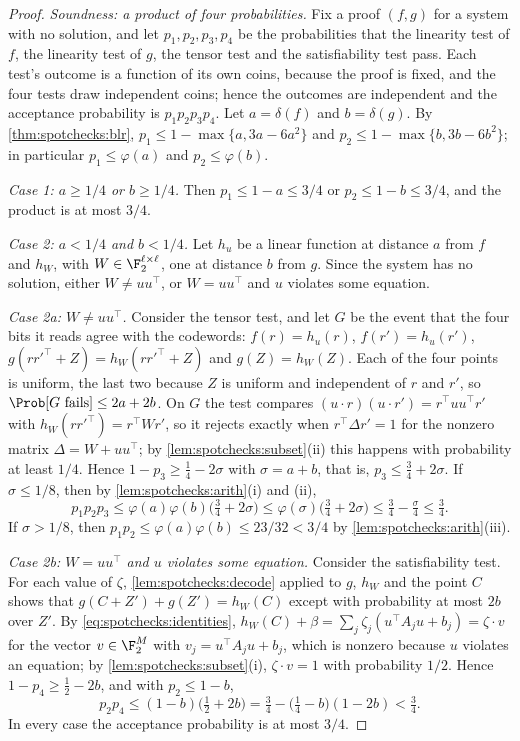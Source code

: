 \begin{refsection}
\begin{proof}
\emph{Soundness: a product of four probabilities.} Fix a proof $(f,g)$ for a system with no solution, and let $p_1,p_2,p_3,p_4$ be the probabilities that the linearity test of $f$, the linearity test of $g$, the tensor test and the satisfiability test pass. Each test's outcome is a function of its own coins, because the proof is fixed, and the four tests draw independent coins; hence the outcomes are independent and the acceptance probability is $p_1p_2p_3p_4$. Let $a=\delta(f)$ and $b=\delta(g)$. By \cref{thm:spotchecks:blr}, $p_1\le1-\max\{a,3a-6a^2\}$ and $p_2\le1-\max\{b,3b-6b^2\}$; in particular $p_1\le\varphi(a)$ and $p_2\le\varphi(b)$.

\emph{Case 1: $a\ge1/4$ or $b\ge1/4$.} Then $p_1\le1-a\le3/4$ or $p_2\le1-b\le3/4$, and the product is at most $3/4$.

\emph{Case 2: $a<1/4$ and $b<1/4$.} Let $h_u$ be a linear function at distance $a$ from $f$ and $h_W$, with $W\in\F_2^{\ell\times\ell}$, one at distance $b$ from $g$. Since the system has no solution, either $W\ne uu^\top$, or $W=uu^\top$ and $u$ violates some equation.

\emph{Case 2a: $W\ne uu^\top$.} Consider the tensor test, and let $G$ be the event that the four bits it reads agree with the codewords: $f(r)=h_u(r)$, $f(r')=h_u(r')$, $g(rr'^\top+Z)=h_W(rr'^\top+Z)$ and $g(Z)=h_W(Z)$. Each of the four points is uniform, the last two because $Z$ is uniform and independent of $r$ and $r'$, so $\Prob[G\text{ fails}]\le2a+2b$. On $G$ the test compares $(u\cdot r)(u\cdot r')=r^\top uu^\top r'$ with $h_W(rr'^\top)=r^\top Wr'$, so it rejects exactly when $r^\top\Delta r'=1$ for the nonzero matrix $\Delta=W+uu^\top$; by \cref{lem:spotchecks:subset}(ii) this happens with probability at least $1/4$. Hence $1-p_3\ge\frac14-2\sigma$ with $\sigma=a+b$, that is, $p_3\le\frac34+2\sigma$. If $\sigma\le1/8$, then by \cref{lem:spotchecks:arith}(i) and (ii),
\[
  p_1p_2p_3\le\varphi(a)\varphi(b)\bigl(\tfrac34+2\sigma\bigr)\le\varphi(\sigma)\bigl(\tfrac34+2\sigma\bigr)\le\tfrac34-\tfrac\sigma4\le\tfrac34.
\]
If $\sigma>1/8$, then $p_1p_2\le\varphi(a)\varphi(b)\le23/32<3/4$ by \cref{lem:spotchecks:arith}(iii).

\emph{Case 2b: $W=uu^\top$ and $u$ violates some equation.} Consider the satisfiability test. For each value of $\zeta$, \cref{lem:spotchecks:decode} applied to $g$, $h_W$ and the point $C$ shows that $g(C+Z')+g(Z')=h_W(C)$ except with probability at most $2b$ over $Z'$. By \eqref{eq:spotchecks:identities}, $h_W(C)+\beta=\sum_j\zeta_j(u^\top A_ju+b_j)=\zeta\cdot v$ for the vector $v\in\F_2^M$ with $v_j=u^\top A_ju+b_j$, which is nonzero because $u$ violates an equation; by \cref{lem:spotchecks:subset}(i), $\zeta\cdot v=1$ with probability $1/2$. Hence $1-p_4\ge\frac12-2b$, and with $p_2\le1-b$,
\[
  p_2p_4\le(1-b)\bigl(\tfrac12+2b\bigr)=\tfrac34-\bigl(\tfrac14-b\bigr)(1-2b)<\tfrac34.
\]
In every case the acceptance probability is at most $3/4$.


\end{proof}
\end{refsection}
